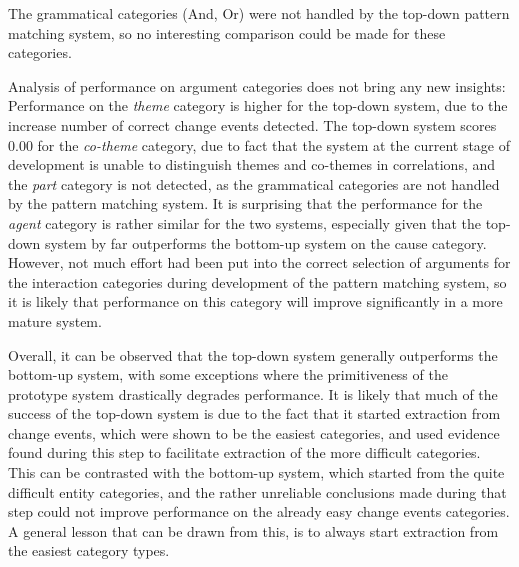 The grammatical categories (And, Or) were not handled by the top-down pattern matching system, so no interesting comparison could be made for these categories.

Analysis of performance on argument categories does not bring any new insights: Performance on the \emph{theme} category is higher for the top-down system, due to the increase number of correct change events detected. The top-down system scores 0.00 for the \emph{co-theme} category, due to fact that the system at the current stage of development is unable to distinguish themes and co-themes in correlations, and the \emph{part} category is not detected, as the grammatical categories are not handled by the pattern matching system. It is surprising that the performance for the \emph{agent} category is rather similar for the two systems, especially given that the top-down system by far outperforms the bottom-up system on the cause category. However, not much effort had been put into the correct selection of arguments for the interaction categories during development of the pattern matching system, so it is likely that performance on this category will improve significantly in a more mature system.

Overall, it can be observed that the top-down system generally outperforms the bottom-up system, with some exceptions where the primitiveness of the prototype system drastically degrades performance. It is likely that much of the success of the top-down system is due to the fact that it started extraction from change events, which were shown to be the easiest categories, and used evidence found during this step to facilitate extraction of the more difficult categories. This can be contrasted with the bottom-up system, which started from the quite difficult entity categories, and the rather unreliable conclusions made during that step could not improve performance on the already easy change events categories. A general lesson that can be drawn from this, is to always start extraction from the easiest category types.